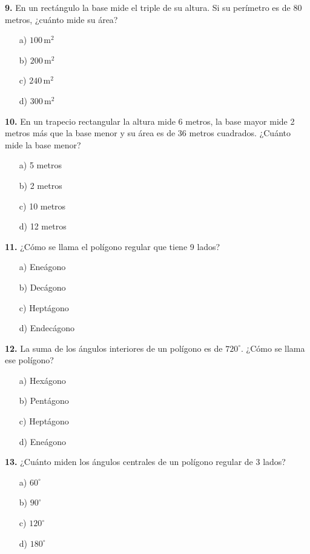 \noindent\textbf{9.} En un rectángulo la base mide el triple de su altura. Si su perímetro es de 80 metros, ¿cuánto mide su área?

\begin{itemize}
    \item[a)] $100\,\text{m}^2$
    \item[b)] $200\,\text{m}^2$
    \item[c)] $240\,\text{m}^2$
    \item[d)] $300\,\text{m}^2$
\end{itemize}

\noindent\textbf{10.} En un trapecio rectangular la altura mide 6 metros, la base mayor mide 2 metros más que la base menor y su área es de 36 metros cuadrados. ¿Cuánto mide la base menor?

\begin{itemize}
    \item[a)] 5 metros
    \item[b)] 2 metros
    \item[c)] 10 metros
    \item[d)] 12 metros
\end{itemize}

\noindent\textbf{11.} ¿Cómo se llama el polígono regular que tiene 9 lados?

\begin{itemize}
    \item[a)] Eneágono
    \item[b)] Decágono
    \item[c)] Heptágono
    \item[d)] Endecágono
\end{itemize}

\noindent\textbf{12.} La suma de los ángulos interiores de un polígono es de $720^\circ$. ¿Cómo se llama ese polígono?

\begin{itemize}
    \item[a)] Hexágono
    \item[b)] Pentágono
    \item[c)] Heptágono
    \item[d)] Eneágono
\end{itemize}

\noindent\textbf{13.} ¿Cuánto miden los ángulos centrales de un polígono regular de 3 lados?

\begin{itemize}
    \item[a)] $60^\circ$
    \item[b)] $90^\circ$
    \item[c)] $120^\circ$
    \item[d)] $180^\circ$
\end{itemize}

